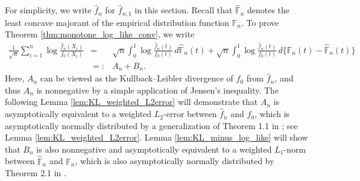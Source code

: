 \documentclass[12pt,letterpaper, twoside, openany]{article}
\theoremstyle{plain}
\begin{document}
For simplicity, we write $\hat{f}_n$ for $\hat{f}_{n,1}$ in this section. Recall that $\hat{\mathbb{F}}_n$ denotes the least concave majorant of the empirical distribution function $\mathbb{F}_n$. To prove Theorem \ref{thm:monotone_log_like_conv}, we write
\begin{eqnarray*}
\frac{1}{\sqrt{n}} \sum^n_{i=1} \log \frac{\hat{f}_{n}(X_i)}{f_0(X_i)}
&=& \sqrt{n}\int_0^1 \log\frac{\hat{f}_n(t)}{f_0(t)} \,d\hat{\mathbb{F}}_n(t) + \sqrt{n}\int_0^1 \log \frac{\hat{f}_n(t)}{f_0(t)} \,d\{\mathbb{F}_n(t)-\hat{\mathbb{F}}_n(t)\} \\
&=:& A_n + B_n. 
\end{eqnarray*}
Here, $A_n$ can be viewed as the Kullback--Leibler divergence of $f_0$ from $\hat{f}_n$, and thus $A_n$ is nonnegative by a simple application of Jensen's inequality. The following 
Lemma \ref{lem:KL_weighted_L2error} will demonstrate that $A_n$ is asymptotically equivalent to a weighted $L_2$-error between $\hat{f}_n$ and $f_0$, which is asymptotically normally distributed by a generalization of Theorem 1.1 in \cite{Kulikov2005}; see Lemma \ref{lem:KL_weighted_L2error}.
Lemma \ref{lem:KL_minus_log_like} will show that $B_n$ is also nonnegative and asymptotically equivalent to a weighted $L_1$-norm between $\hat{\mathbb{F}}_n$ and $\mathbb{F}_n$, which is also asymptotically normally distributed by Theorem 2.1 in \cite{Kulikov2008}.

\end{document}

